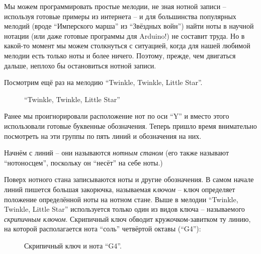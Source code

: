 \documentclass[a4paper,twoside]{book}
\begin{document}
Мы можем программировать простые мелодии, не зная нотной записи -- используя
готовые примеры из интернета -- и для большинства популярных мелодий (вроде
``Имперского марша'' из ``Звёздных войн'') найти ноты в научной нотации (или даже
готовые программы для Arduino!) не составит труда. Но в какой-то момент мы можем
столкнуться с ситуацией, когда для нашей любимой мелодии есть только ноты и
более ничего. Поэтому, прежде, чем двигаться дальше, неплохо бы остановиться
нотной записи.

Посмотрим ещё раз на мелодию ``Twinkle, Twinkle, Little Star''.

\begin{figure}[ht]
  \caption{``Twinkle, Twinkle, Little Star''}
  \centering
  \label{fig:sound-fig-4}
\end{figure}

Ранее мы проигнорировали расположение нот по оси ``Y'' и вместо этого
использовали готовые буквенные обозначения. Теперь пришло время внимательно
посмотреть на эти группы по пять линий и обозначения на них.

Начнём с линий -- они называются \emph{нотным станом} (его также называют
``нотоносцем'', поскольку он ``несёт'' на себе ноты.)

Поверх нотного стана записываются ноты и другие обозначения. В самом начале
линий пишется большая закорючка, называемая \emph{ключом} -- ключ определяет
положение определённой ноты на нотном стане. Выше в мелодии ``Twinkle, Twinkle,
Little Star'' используется только один из видов ключа -- называемого
\emph{скрипичным ключом}. Скрипичный ключ обводит кружочком-завитком ту линию,
на которой располагается нота ``соль'' четвёртой октавы (``G4''):

\begin{figure}[ht]
  \caption{Скрипичный ключ и нота ``G4''.}
  \centering
  \label{fig:lilypond-clef-example}
\end{figure}
\end{document}
